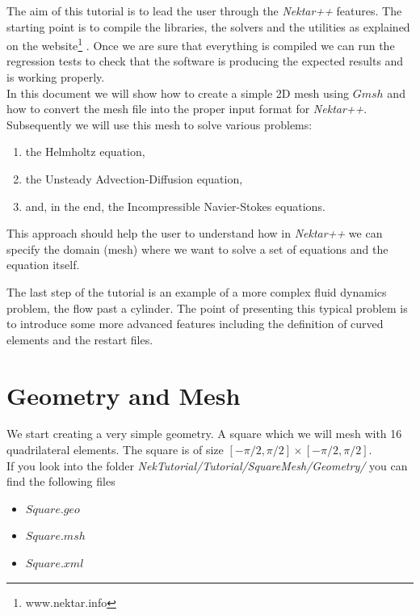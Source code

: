 \documentclass[12pt]{article}
\begin{document}
\maketitle

\noindent
The aim of this tutorial is to lead the user through the \emph{Nektar++} features. The starting point is to compile the libraries, the solvers and the utilities
as explained on the website\footnote{www.nektar.info} . Once we are sure that everything is compiled we can run the regression tests to check that the software is producing the expected results and is working properly.\\

\noindent
In this document we will show how to create a simple 2D mesh using $Gmsh$ and how to convert the mesh file into the proper input format for \emph{Nektar++}.
Subsequently we will use this mesh to solve various problems:
\begin{enumerate}
\item the Helmholtz equation,
\item the Unsteady Advection-Diffusion equation,
\item and, in the end, the Incompressible Navier-Stokes equations. 
\end{enumerate}

\noindent
This approach should help the user to understand how in \emph{Nektar++}  we can specify the domain (mesh) where we want to solve a set of equations and
the equation itself.

\noindent
The last step of the tutorial is an example of a more complex fluid dynamics problem, the flow past a cylinder. The point of presenting this typical problem is to introduce some
more advanced features including the definition of curved elements and the restart files. 

\section{Geometry and Mesh}

We start creating a very simple geometry. A square which we will mesh with 16 quadrilateral elements.
The square is of size $[-\pi/2,\pi/2]\times[-\pi/2,\pi/2]$.\\

\noindent
If you look into the folder \emph{NekTutorial/Tutorial/SquareMesh/Geometry/}  you can find the following files
\begin{itemize}
\item $Square.geo$
\item $Square.msh$
\item $Square.xml$\\
\end{itemize}
\end{document}
